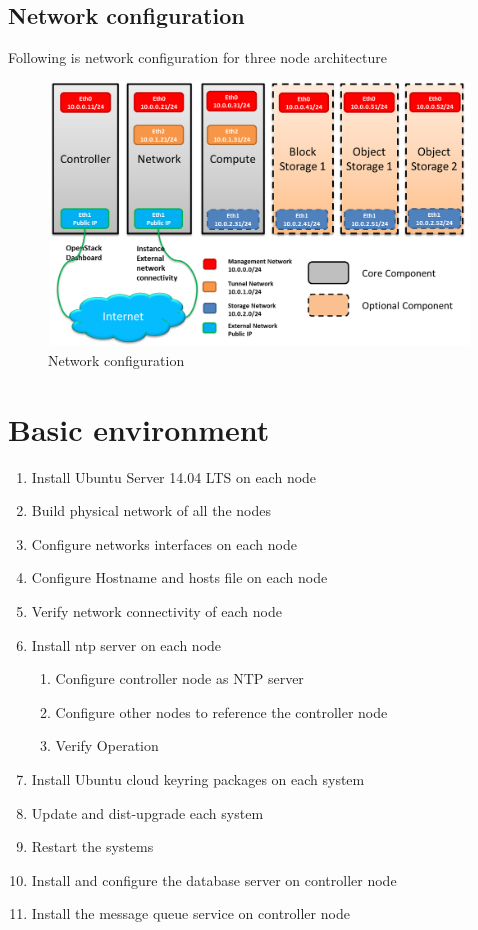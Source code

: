     \subsection{Network configuration}
    \par Following is network configuration for three node architecture 
    \begin{figure}[h]
        \centering
        \includegraphics[height=7cm,width=13cm]{images/network_config.png}
        \caption{Network configuration} 
     \end{figure}
     
\section{Basic environment}
    \begin{enumerate}
        \item Install Ubuntu Server 14.04 LTS  on each node
        \item Build physical network of all the nodes
        \item Configure networks interfaces on each node
        \item Configure Hostname and hosts file on each node
        \item Verify network connectivity of each node
        \item Install ntp server on each node
        \begin{enumerate}
            \item Configure controller node as NTP server 
            \item Configure other nodes to reference the controller node
            \item Verify Operation
        \end{enumerate}
        \item Install Ubuntu cloud keyring packages on each system
        \item Update and dist-upgrade each system
        \item Restart the systems
        \item Install and configure the database server on controller node
        \item Install the message queue service on controller node
    \end{enumerate}
    
